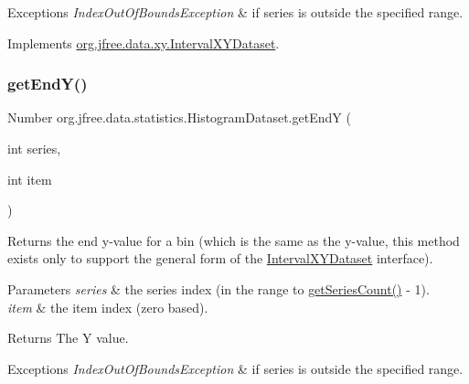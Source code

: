 \begin{DoxyExceptions}{Exceptions}
{\em Index\+Out\+Of\+Bounds\+Exception} & if {\ttfamily series} is outside the specified range. \\
\hline
\end{DoxyExceptions}


Implements \mbox{\hyperlink{interfaceorg_1_1jfree_1_1data_1_1xy_1_1_interval_x_y_dataset_a93161a6d6c1db37cfac030239c62ab0a}{org.\+jfree.\+data.\+xy.\+Interval\+X\+Y\+Dataset}}.

\mbox{\label{classorg_1_1jfree_1_1data_1_1statistics_1_1_histogram_dataset_a3bf9d22d1d5a7d47ca3746c706198afe}} 
\subsubsection{\texorpdfstring{get\+End\+Y()}{getEndY()}}
{\footnotesize\ttfamily Number org.\+jfree.\+data.\+statistics.\+Histogram\+Dataset.\+get\+EndY (\begin{DoxyParamCaption}\item[{int}]{series,  }\item[{int}]{item }\end{DoxyParamCaption})}

Returns the end y-\/value for a bin (which is the same as the y-\/value, this method exists only to support the general form of the \mbox{\hyperlink{}{Interval\+X\+Y\+Dataset}} interface).


\begin{DoxyParams}{Parameters}
{\em series} & the series index (in the range {} to {\ttfamily \mbox{\hyperlink{classorg_1_1jfree_1_1data_1_1statistics_1_1_histogram_dataset_a6dd14ceca0cb3f9b3d666a2aec480f8d}{get\+Series\+Count()}} -\/ 1}). \\
\hline
{\em item} & the item index (zero based).\\
\hline
\end{DoxyParams}
\begin{DoxyReturn}{Returns}
The Y value.
\end{DoxyReturn}

\begin{DoxyExceptions}{Exceptions}
{\em Index\+Out\+Of\+Bounds\+Exception} & if {\ttfamily series} is outside the specified range. \\
\hline
\end{DoxyExceptions}


